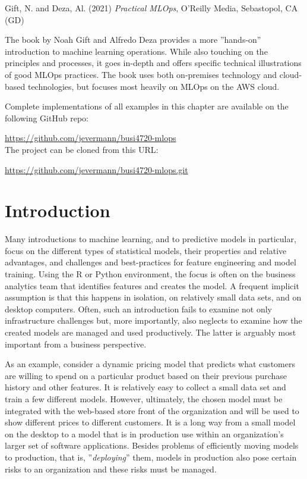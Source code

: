 \begin{resourcebox}
Gift, N. and Deza, Al. (2021) \emph{Practical MLOps}, O'Reilly Media, Sebastopol, CA (GD)
\end{resourcebox}

The book by Noah Gift and Alfredo Deza provides a more ''hands-on'' introduction to machine learning operations. While also touching on the principles and processes, it goes in-depth and offers specific technical illustrations of good MLOps practices. The book uses both on-premises technology and cloud-based technologies, but focuses most heavily on MLOps on the AWS cloud. 


\begin{resourcebox}
Complete implementations of all examples in this chapter are available on the following GitHub repo:

\small\url{https://github.com/jevermann/busi4720-mlops}\normalsize \\

The project can be cloned from this URL:

\small\url{https://github.com/jevermann/busi4720-mlops.git}\normalsize
\end{resourcebox}


\section{Introduction}

Many introductions to machine learning, and to predictive models in particular, focus on the different types of statistical models, their properties and relative advantages, and challenges and best-practices for feature engineering and model training. Using the R or Python environment, the focus is often on the business analytics team that identifies features and creates the model. A frequent implicit assumption is that this happens in isolation, on relatively small data sets, and on desktop computers. Often, such an introduction fails to examine not only infrastructure challenges but, more importantly, also neglects to examine how the created models are managed and used productively. The latter is arguably most important from a business perspective.

As an example, consider a dynamic pricing model that predicts what customers are willing to spend on a particular product based on their previous purchase history and other features. It is relatively easy to collect a small data set and train a few different models. However, ultimately, the chosen model must be integrated with the web-based store front of the organization and will be used to show different prices to different customers. It is a long way from a small model on the desktop to a model that is in production use within an organization's larger set of software applications. Besides problems of efficiently moving models to production, that is, ''\emph{deploying}'' them, models in production also pose certain risks to an organization and these risks must be managed. 

